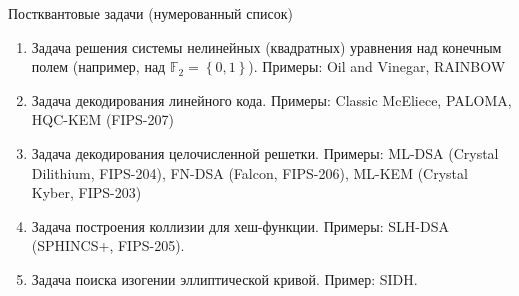 \documentclass[aspectratio=169, 12pt]{beamer}
\begin{document}
\begin{frame}[label={sec:org790bc90}]{Постквантовые задачи (нумерованный список)}
    \begin{enumerate}[<+->]
        \item Задача решения системы нелинейных (квадратных) уравнения над конечным полем (например, над \(\mathbb{F}_{2}=\left\{0,1\right\}\)). Примеры: Oil and Vinegar, RAINBOW
        \item Задача декодирования линейного кода. Примеры: Classic McEliece, PALOMA, HQC-KEM (FIPS-207)
        \item Задача декодирования целочисленной решетки. Примеры: ML-DSA (Crystal Dilithium, FIPS-204), FN-DSA (Falcon, FIPS-206), ML-KEM (Crystal Kyber, FIPS-203)
        \item Задача построения коллизии для хеш-функции. Примеры: SLH-DSA (SPHINCS+, FIPS-205).
        \item Задача поиска изогении эллиптической кривой. Пример: SIDH.
    \end{enumerate}
\end{frame}
\end{document}
